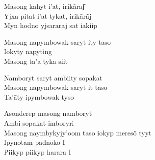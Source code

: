 \bigskip

\begin{linenumbers}\begingroup\raggedright
\noindent Masong kahyt i'at, irikãraj͂\\
Yjxa pitat i'at tykat, irikãrãj\\
Myn hodno yjsararaj sat iakiip
\end{linenumbers}\endgroup

\bigskip

\begin{linenumbers}\begingroup\raggedright
\noindent Masong napymbowak saryt ity taso\\
Iokyty napyting\\
Masong ta'a tyka siit
\end{linenumbers}\endgroup

\bigskip

\begin{linenumbers}\begingroup\raggedright
\noindent Namboryt saryt ambiity sopakat\\
Masong napymbowak saryt it taso\\
Ta'ãty ipymbowak tyso
\end{linenumbers}\endgroup

\bigskip

\begin{linenumbers}\begingroup\raggedright
\noindent Asonderep masong namboryt\\
Ambi sopakat imboryri\\
Masong naymbykyjy'oom taso iokyp meresõ tyyt\\
Ipynotam padnoko I\\
Piikyp piikyp harara I
\end{linenumbers}\endgroup

